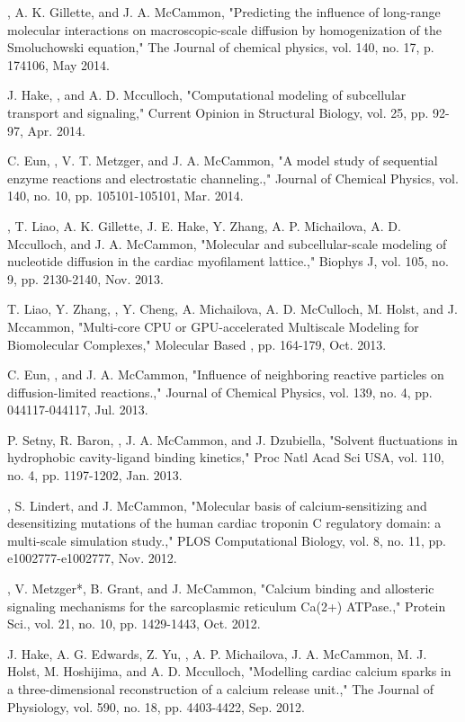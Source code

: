 \begin{etaremune}
\item \pmkh, A. K. Gillette, and J. A. McCammon, "Predicting the influence of long-range molecular interactions on macroscopic-scale diffusion by homogenization of the Smoluchowski equation," The Journal of chemical physics, vol. 140, no. 17, p. 174106, May 2014.
\item J. Hake, \pmkh, and A. D. Mcculloch, "Computational modeling of subcellular transport and signaling," Current Opinion in Structural Biology, vol. 25, pp. 92-97, Apr. 2014.
\item C. Eun, \pmkh*, V. T. Metzger, and J. A. McCammon, "A model study of sequential enzyme reactions and electrostatic channeling.," Journal of Chemical Physics, vol. 140, no. 10, pp. 105101-105101, Mar. 2014.
\item \pmkh, T. Liao, A. K. Gillette, J. E. Hake, Y. Zhang, A. P. Michailova, A. D. Mcculloch, and J. A. McCammon, "Molecular and subcellular-scale modeling of nucleotide diffusion in the cardiac myofilament lattice.," Biophys J, vol. 105, no. 9, pp. 2130-2140, Nov. 2013.
\item T. Liao, Y. Zhang, \pmkh, Y. Cheng, A. Michailova, A. D. McCulloch, M. Holst, and J. Mccammon, "Multi-core CPU or GPU-accelerated Multiscale Modeling for Biomolecular Complexes," Molecular Based , pp. 164-179, Oct. 2013.
\item C. Eun, \pmkh, and J. A. McCammon, "Influence of neighboring reactive particles on diffusion-limited reactions.," Journal of Chemical Physics, vol. 139, no. 4, pp. 044117-044117, Jul. 2013.
\item P. Setny, R. Baron, \pmkh, J. A. McCammon, and J. Dzubiella, "Solvent fluctuations in hydrophobic cavity-ligand binding kinetics," Proc Natl Acad Sci USA, vol. 110, no. 4, pp. 1197-1202, Jan. 2013.
\item \pmkh, S. Lindert, and J. McCammon, "Molecular basis of calcium-sensitizing and desensitizing mutations of the human cardiac troponin C regulatory domain: a multi-scale simulation study.," PLOS Computational Biology, vol. 8, no. 11, pp. e1002777-e1002777, Nov. 2012.
\item \pmkh*, V. Metzger*, B. Grant, and J. McCammon, "Calcium binding and allosteric signaling mechanisms for the sarcoplasmic reticulum Ca(2+)  ATPase.," Protein Sci., vol. 21, no. 10, pp. 1429-1443, Oct. 2012.
\item J. Hake, A. G. Edwards, Z. Yu, \pmkh, A. P. Michailova, J. A. McCammon, M. J. Holst, M. Hoshijima, and A. D. Mcculloch, "Modelling cardiac calcium sparks in a three-dimensional reconstruction of a calcium release unit.," The Journal of Physiology, vol. 590, no. 18, pp. 4403-4422, Sep. 2012.

\end{etaremune}
